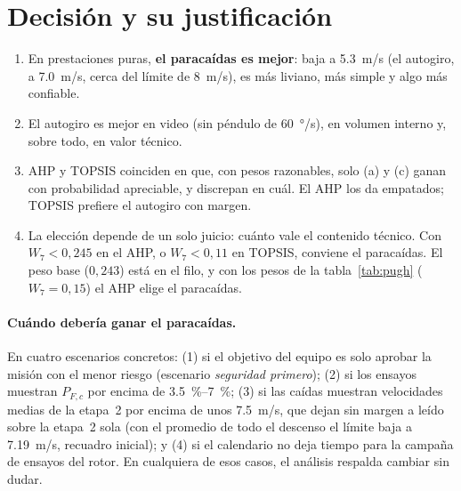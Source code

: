 \section{Decisión y su justificación}\label{sec:decision-final}

\begin{resultado}
\begin{enumerate}
  \item En prestaciones puras, \textbf{el paracaídas es mejor}: baja a
        \SI{5.3}{m/s} (el autogiro, a \SI{7.0}{m/s}, cerca del límite de \SI{8}{m/s}),
        es más liviano, más simple y algo más confiable.
  \item El autogiro es mejor en video (sin péndulo de \SI{60}{\degree/s}), en volumen
        interno y, sobre todo, en valor técnico.
  \item AHP y TOPSIS coinciden en que, con pesos razonables, solo (a) y (c) ganan con
        probabilidad apreciable, y discrepan en cuál. El AHP los da empatados; TOPSIS
        prefiere el autogiro con margen.
  \item La elección depende de un solo juicio: cuánto vale el contenido técnico. Con
        $W_7<0{,}245$ en el AHP, o $W_7<0{,}11$ en TOPSIS, conviene el paracaídas. El
        peso base ($0{,}243$) está en el filo, y con los pesos de la tabla~\ref{tab:pugh}
        ($W_7=0{,}15$) el AHP elige el paracaídas.
\end{enumerate}
\end{resultado}

\paragraph{Cuándo debería ganar el paracaídas.} En cuatro escenarios concretos: (1) si el
objetivo del equipo es solo aprobar la misión con el menor riesgo (escenario
\emph{seguridad primero}); (2) si los ensayos muestran $P_{F,c}$ por encima de
\SIrange{3.5}{7}{\percent}; (3) si las caídas muestran velocidades medias de la etapa~2
por encima de unos \SI{7.5}{m/s}, que dejan sin margen a  leído sobre la etapa~2 sola (con el promedio
de todo el descenso el límite baja a \SI{7.19}{m/s}, recuadro inicial); y (4) si el calendario
no deja tiempo para la campaña de ensayos del rotor. En cualquiera de esos casos, el
análisis respalda cambiar sin dudar.


